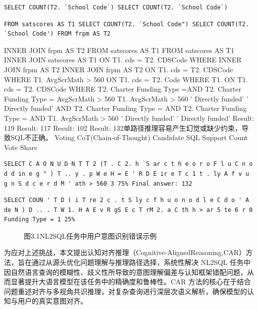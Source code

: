 \documentclass[12pt,a4paper,openright,UTF8]{ctexbook}
\begin{document}
\begin{lstlisting}
SELECT COUNT(T2. `School Code`) SELECT COUNT(T2. `School Code`)
\end{lstlisting}


\begin{lstlisting}
FROM satscores AS T1 SELECT COUNT(T2. `School Code") SELECT COUNT(T2. `School Code') FROM frpm AS T2
\end{lstlisting}

INNER JOIN frpm AS T2 FROM satscores AS T1 FROM satscores AS T1 INNER JOIN satscores AS T1 ON T1. cds = T2. CDSCode WHERE INNER JOIN frpm AS T2 INNER JOIN frpm AS T2 ON T1. cds = T2. CDSCode WHERE T1. AvgScrMath > 560 ON T1. cds = T2. Code WHERE T1. ON T1. cds = T2. CDSCode WHERE T2. Charter Funding Type =AND T2. Charter Funding Type = AvgScrMath > 560 T1. AvgScrMath > 560 ' Directly funded' ' Directly funded' AND T2. Charter Funding Type = AND T2. Charter Funding Type = AND T1. AvgScrMath > 560 ' Directly funded' ' Directly funded' Result: 119 Result: 117 Result: 102 Result: 132单路径推理容易产生幻觉或缺少约束，导致SQL不正确。 Voting CoT(Chain-of-Thought) Candidate SQL Support Count Vote Share

\begin{lstlisting}
SELECT C A O N U D N T T 2 (T . C 2. h `S ar c t h e o r o F l u C n o d d in e g " ) T .. y . p W e H = E ' R D E ir e T c 1 t . ly A f v u g n S d c e r d M ' ath > 560 3 75% Final answer: 132
\end{lstlisting}


\begin{lstlisting}
SELECT COUN ' T D ( i T re 2 c . t S ly c f h u o n o d l e C d o ' A de N ) D .. . T W 1. H A E v R gS E c T rM 2. a C th h > ar 5 te 6 r 0 Funding Type = 1 25%
\end{lstlisting}


\begin{figure}[htbp]
\centering
{}
\caption{图3.1NL2SQL任务中用户意图识别错误示例}
\end{figure}

为应对上述挑战，本文提出认知对齐推理（Cognitive-AlignedReasoning,CAR）方法，旨在通过从源头优化问题理解与推理路径选择，系统性解决 NL2SQL 任务中因自然语言查询的模糊性、歧义性所导致的意图理解偏差与认知框架错配问题，从而显著提升大语言模型在该任务中的精确度和鲁棒性。CAR 方法的核心在于结合问题重述对齐与多视角共识推理，对复杂查询进行深层次语义解析，确保模型的认知与用户的真实意图对齐。
\end{document}
